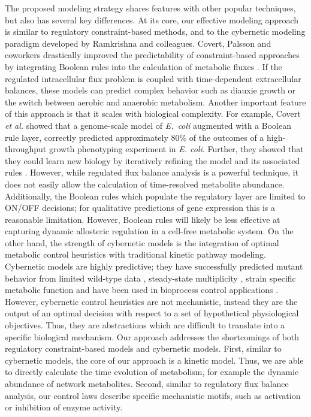\documentclass[processes,article,accept,moreauthors,pdftex,12pt,a4paper]{mdpi}
\begin{document}
The proposed modeling strategy shares features with other popular techniques, but also has several key differences. 
At its core, our effective modeling approach is similar to regulatory constraint-based methods, and to the cybernetic modeling paradigm developed by Ramkrishna and colleagues.
Covert, Palsson and coworkers drastically improved the predictability of constraint-based approaches by integrating Boolean rules into the calculation of metabolic fluxes \citep{Covert:2001aa}.
If the regulated intracellular flux problem is coupled with time-dependent extracellular balances, these models can predict complex behavior such as diauxie growth or the switch between 
aerobic and anaerobic metabolism. Another important feature of this approach is that it scales with biological complexity. 
For example, Covert \emph{et al.} showed that a genome-scale model of \emph{E.~coli} augmented with a Boolean rule layer, 
correctly predicted approximately 80\% of the outcomes of a high-throughput growth phenotyping experiment in \emph{E. coli}.
Further, they showed that they could learn new biology by iteratively refining the model and its associated rules \citep{Covert:2004aa}. 
However, while regulated flux balance analysis is a powerful technique, it does not easily allow the calculation of time-resolved metabolite abundance. 
Additionally, the Boolean rules which populate the regulatory layer are limited to ON/OFF decisions; for qualitative predictions of gene expression this is a reasonable limitation. 
However, Boolean rules will likely be less effective at capturing dynamic allosteric regulation in a cell-free metabolic system. 
On the other hand, the strength of cybernetic models is the integration of optimal metabolic control heuristics with traditional kinetic pathway modeling. 
Cybernetic models are highly predictive; they have successfully predicted mutant behavior from limited wild-type data \citep{1999_varner_ramkrishna_MetaEng,Varner:2000aa,Song:2012aa}, 
steady-state multiplicity \citep{2012_kim_ramkrishna_BiotechProg}, strain specific metabolic function \citep{Song:2011aa} and have been used in bioprocess control applications \citep{Gadkar:2003aa}.
However, cybernetic control heuristics are not mechanistic, instead they are the output of an optimal decision with respect to a set of hypothetical physiological objectives. 
Thus, they are abstractions which are difficult to translate into a specific biological mechanism. 
Our approach addresses the shortcomings of both regulatory constraint-based models and cybernetic models. 
First, similar to cybernetic models, the core of our approach is a kinetic model. Thus, we are able to directly calculate the time evolution of metabolism, for example the dynamic abundance of network metabolites. Second, similar to regulatory flux balance analysis, our control laws describe specific mechanistic motifs, such as activation or inhibition of enzyme activity. 
\end{document}
